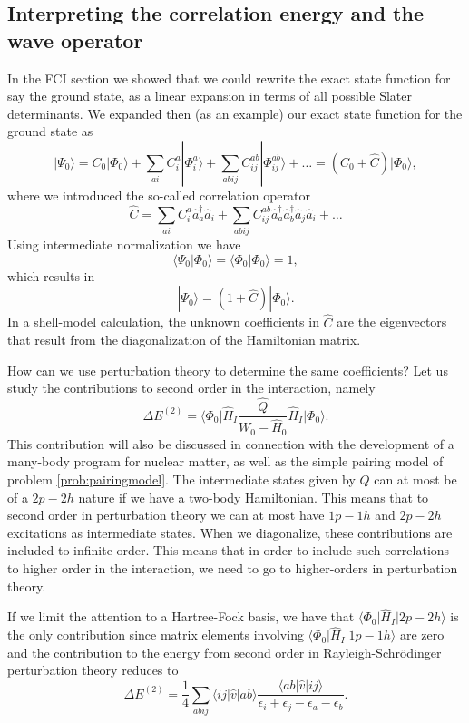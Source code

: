 \subsection{Interpreting the correlation energy and the wave operator}

In the FCI section  we showed that we could rewrite the exact state function for say the ground state, as a linear expansion in terms of all possible Slater determinants. 
We expanded then  (as an example) our exact state function for the ground state as
\[
|\Psi_0\rangle=C_0|\Phi_0\rangle+\sum_{ai}C_i^a|\Phi_i^a\rangle+\sum_{abij}C_{ij}^{ab}|\Phi_{ij}^{ab}\rangle+\dots
=(C_0+\hat{C})|\Phi_0\rangle,
\]
where we introduced the so-called correlation operator 
\[
\hat{C}=\sum_{ai}C_i^a\hat{a}_{a}^{\dagger}\hat{a}_i  +\sum_{abij}C_{ij}^{ab}\hat{a}_{a}^{\dagger}\hat{a}_{b}^{\dagger}\hat{a}_j\hat{a}_i+\dots
\]
Using intermediate normalization we have
\[
\langle \Psi_0 | \Phi_0 \rangle = \langle \Phi_0 | \Phi_0 \rangle = 1, 
\]
which results in 
\[
|\Psi_0\rangle=(1+\hat{C})|\Phi_0\rangle.
\]
In a shell-model calculation, the unknown coefficients in $\hat{C}$ are the 
eigenvectors that result from the diagonalization of the Hamiltonian matrix.

How can we use perturbation theory to determine the same coefficients? Let us study the contributions to second order in the interaction, namely
\[
\Delta E^{(2)}=\langle\Phi_0\vert \hat{H}_I\frac{\hat{Q}}{W_0-\hat{H}_0}\hat{H}_I\vert \Phi_0\rangle.
\]
This contribution will also be discussed in connection with the development of a many-body program for nuclear matter, as well as the simple pairing model of problem \ref{prob:pairingmodel}.
The intermediate states given by $\hat{Q}$ can at most be of a $2p-2h$ nature if we have a two-body Hamiltonian. This means that to second order in perturbation theory we can at most have $1p-1h$ and $2p-2h$ excitations as intermediate states. When we diagonalize, these contributions are included to infinite order. This means that in order to include such correlations to higher order in the interaction, we need to go to higher-orders in perturbation theory. 

If we limit the attention to a Hartree-Fock basis, we have that
$\langle\Phi_0\vert \hat{H}_I \vert 2p-2h\rangle$ is the only contribution since 
matrix elements involving $\langle\Phi_0\vert \hat{H}_I \vert 1p-1h\rangle$ are zero 
and the contribution to the energy from second order in Rayleigh-Schr\"odinger perturbation theory reduces to
\[
\Delta E^{(2)}=\frac{1}{4}\sum_{abij}\langle ij\vert \hat{v}\vert ab\rangle \frac{\langle ab\vert \hat{v}\vert ij\rangle}{\epsilon_i+\epsilon_j-\epsilon_a-\epsilon_b}.
\]


